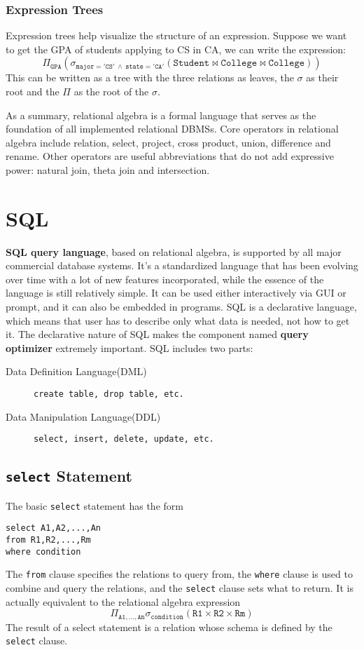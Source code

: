 \subsubsection{Expression Trees}
Expression trees help visualize the structure of an expression. Suppose we want to get the GPA of students applying to CS in CA, we can write the expression:
\begin{equation*}
\mathtt{\Pi_{GPA}(\sigma_{major='CS'\:\land\:state='CA'}(Student\bowtie College\bowtie College))}
\end{equation*}
This can be written as a tree with the three relations as leaves, the $\sigma$ as their root and the $\Pi$ as the root of the $\sigma$.

As a summary, relational algebra is a formal language that serves as the foundation of all implemented relational DBMSs. Core operators in relational algebra include relation, select, project, cross product, union, difference and rename. Other operators are useful abbreviations that do not add expressive power: natural join, theta join and intersection. 
\section{SQL}
\textbf{SQL query language}, based on relational algebra, is supported by all major commercial database systems. It's a standardized language that has been evolving over time with a lot of new features incorporated, while the essence of the language is still relatively simple. It can be used either interactively via GUI or prompt, and it can also be embedded in programs. SQL is a declarative language, which means that user has to describe only what data is needed, not how to get it. The declarative nature of SQL makes the component named \textbf{query optimizer} extremely important. SQL includes two parts:
\begin{description}
\item[Data Definition Language(DML)] \texttt{create table, drop table, etc.}
\item[Data Manipulation Language(DDL)]\texttt{select, insert, delete, update, etc.}
\end{description}
\subsection{\texttt{select} Statement}
The basic \texttt{select} statement has the form
\begin{lstlisting}
select A1,A2,...,An
from R1,R2,...,Rm
where condition
\end{lstlisting}
The \texttt{from} clause specifies the relations to query from, the \texttt{where} clause is used to combine and query the relations, and the \texttt{select} clause sets what to return. It is actually equivalent to the relational algebra expression
\begin{equation*}
\mathtt{\Pi_{A1,\dots,An}\sigma_{condition}(R1\times R2\times Rm)}
\end{equation*}
The result of a select statement is a relation whose schema is defined by the \texttt{select} clause. 

